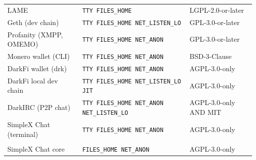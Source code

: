 {\begin{longtable}{@{}>{\raggedright\arraybackslash}p{3.6cm}>{\raggedright\arraybackslash}p{6.6cm}>{\raggedright\arraybackslash}p{4.2cm}@{}}
LAME & \texttt{TTY FILES\_HOME} & LGPL-2.0-or-later\\
Geth (dev chain) & \texttt{TTY FILES\_HOME NET\_LISTEN\_LO} & GPL-3.0-or-later\\
Profanity (XMPP, OMEMO) & \texttt{TTY FILES\_HOME NET\_ANON} & GPL-3.0-or-later\\
Monero wallet (CLI) & \texttt{TTY FILES\_HOME NET\_ANON} & BSD-3-Clause\\
DarkFi wallet (drk) & \texttt{TTY FILES\_HOME NET\_ANON} & AGPL-3.0-only\\
DarkFi local dev chain & \texttt{TTY FILES\_HOME NET\_LISTEN\_LO JIT} & AGPL-3.0-only\\
DarkIRC (P2P chat) & \texttt{TTY FILES\_HOME NET\_ANON NET\_LISTEN\_LO} & AGPL-3.0-only AND MIT\\
SimpleX Chat (terminal) & \texttt{TTY FILES\_HOME NET\_ANON} & AGPL-3.0-only\\
\addlinespace
\multicolumn{3}{@{}l}{\textit{A background engine} (1)}\\
SimpleX Chat core & \texttt{FILES\_HOME NET\_ANON} & AGPL-3.0-only\\
\bottomrule
\end{longtable}}
